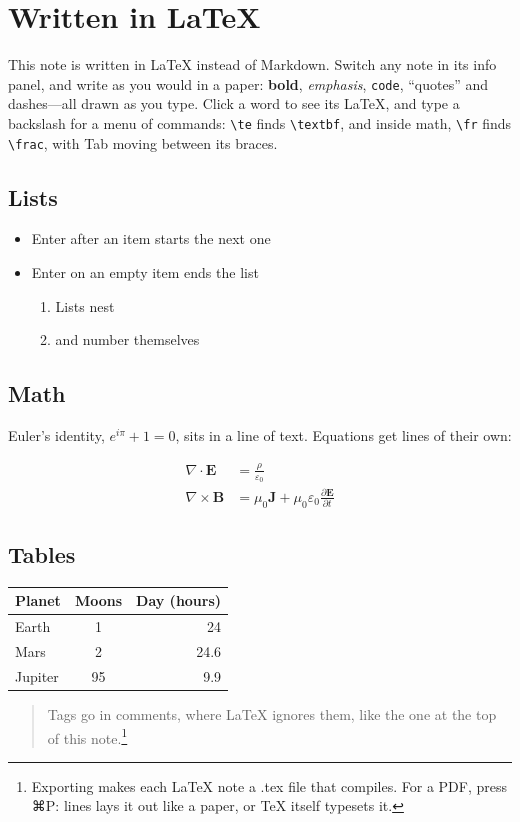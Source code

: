 \section{Written in LaTeX}

This note is written in \LaTeX{} instead of Markdown. Switch any note in its info panel, and write as you would in a paper: \textbf{bold}, \emph{emphasis}, \texttt{code}, ``quotes'' and dashes---all drawn as you type. Click a word to see its LaTeX, and type a backslash for a menu of commands: \texttt{\textbackslash te} finds \texttt{\textbackslash textbf}, and inside math, \texttt{\textbackslash fr} finds \texttt{\textbackslash frac}, with Tab moving between its braces.

\subsection{Lists}
\begin{itemize}
  \item Enter after an item starts the next one
  \item Enter on an empty item ends the list
  \begin{enumerate}
    \item Lists nest
    \item and number themselves
  \end{enumerate}
\end{itemize}

\subsection{Math}
Euler's identity, $e^{i\pi} + 1 = 0$, sits in a line of text. Equations get lines of their own:

\begin{align*}
  \nabla \cdot \mathbf{E} &= \frac{\rho}{\varepsilon_0} \\
  \nabla \times \mathbf{B} &= \mu_0 \mathbf{J} + \mu_0 \varepsilon_0 \frac{\partial \mathbf{E}}{\partial t}
\end{align*}

\subsection{Tables}
\begin{tabular}{lcr}
  Planet & Moons & Day (hours) \\
  \hline
  Earth & 1 & 24 \\
  Mars & 2 & 24.6 \\
  Jupiter & 95 & 9.9 \\
\end{tabular}

\begin{quote}
Tags go in comments, where \LaTeX{} ignores them, like the one at the top of this note.\footnote{Exporting makes each LaTeX note a .tex file that compiles. For a PDF, press ⌘P: lines lays it out like a paper, or TeX itself typesets it.}
\end{quote}
